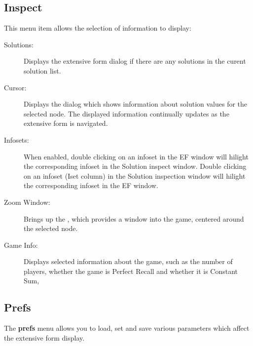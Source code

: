 \subsection{Inspect}\label{efinspect}

This menu item allows the selection of information to display:

\begin{description}
\item[Solutions:] Displays the extensive form  dialog if there are any solutions in
the curent solution list.
\item[Cursor:] Displays the  dialog
which shows information about solution values for the selected
node. The displayed information continually updates as the extensive
form is navigated.
\item[Infosets:] When enabled, double clicking on an infoset in the EF
window will hilight the corresponding infoset in the Solution inspect
window.  Double clicking on an infoset (Iset column) in the Solution
inspection window will hilight the corresponding infoset in the EF
window.
\item[Zoom Window:] Brings up the ,
which provides a window into the game, centered around the selected
node.
\item[Game Info:] Displays selected information about the game, such
as the number of players, whether the game is Perfect Recall and
whether it is Constant Sum,
\end{description}

\subsection{Prefs}\label{displaymenu}

The {\bf prefs} menu allows you to load, set and save various
parameters which affect the extensive form display.


